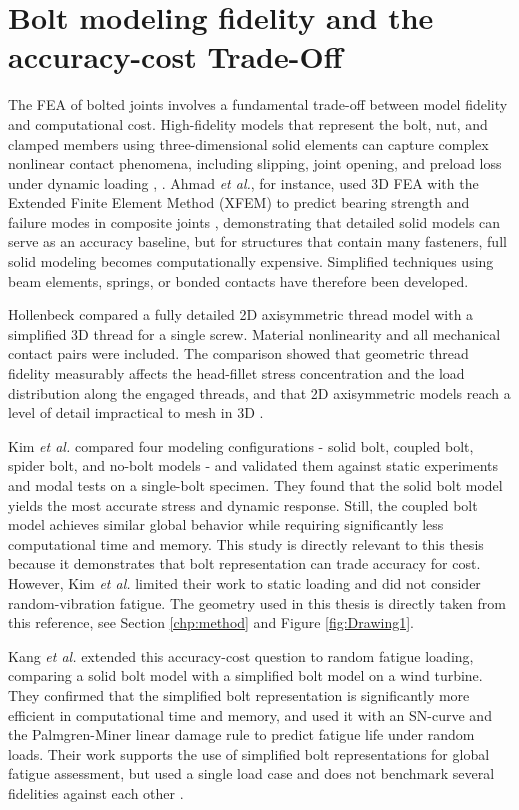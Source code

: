 \documentclass[a4paper,twoside]{bth}
\begin{document}
\section{Bolt modeling fidelity and the accuracy-cost Trade-Off}
\label{sec:bolt-modeling}

The \ac{FEA} of bolted joints involves a fundamental trade-off between model fidelity and computational cost. High-fidelity models that represent the bolt, nut, and clamped members using three-dimensional solid elements can capture complex nonlinear contact phenomena, including slipping, joint opening, and preload loss under dynamic loading \cite{Hollenbeck2023AssembledScrew}, \cite{27}. Ahmad \textit{et al.}, for instance, used 3D \ac{FEA} with the Extended Finite Element Method (XFEM) to predict bearing strength and failure modes in composite joints \cite{01}, demonstrating that detailed solid models can serve as an accuracy baseline, but for structures that contain many fasteners, full solid modeling becomes computationally expensive. Simplified techniques using beam elements, springs, or bonded contacts have therefore been developed.



Hollenbeck compared a fully detailed 2D axisymmetric thread model with a simplified 3D thread for a single screw. Material nonlinearity and all mechanical contact pairs were included.
The comparison showed that geometric thread fidelity measurably affects the head-fillet stress concentration and the load distribution along the engaged threads, and that 2D axisymmetric models reach a level of detail impractical to mesh in 3D \cite{Hollenbeck2023AssembledScrew}.

Kim \textit{et al.} compared four modeling configurations - solid bolt, coupled bolt, spider bolt, and no-bolt models - and validated them against static experiments and modal tests \cite{27} on a single-bolt specimen. They found that the solid bolt model yields the most accurate stress and dynamic response. Still, the coupled bolt model achieves similar global behavior while requiring significantly less computational time and memory. This study is directly relevant to this thesis because it demonstrates that bolt representation can trade accuracy for cost. However, Kim \textit{et al.} limited their work to static loading and did not consider random-vibration fatigue. The geometry used in this thesis is directly taken from this reference, see Section \ref{chp:method} and Figure \ref{fig:Drawing1}.

Kang \textit{et al.} extended this accuracy-cost question to random fatigue loading, comparing a solid bolt model with a simplified bolt model on a wind turbine. They confirmed that the simplified bolt representation is significantly more efficient in computational time and memory, and used it with an SN-curve and the Palmgren-Miner linear damage rule to predict fatigue life under random loads. Their work supports the use of simplified bolt representations for global fatigue assessment, but used a single load case and does not benchmark several fidelities against each other \cite{10}.
\end{document}
